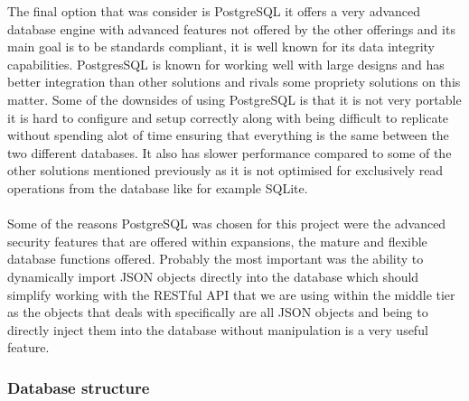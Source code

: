 The final option that was consider is PostgreSQL it offers a very advanced database engine with advanced features not offered by the other offerings and its main goal is to be standards compliant, it is well known for its data integrity capabilities. PostgresSQL is known for working well with large designs and has better integration than other solutions and rivals some propriety solutions on this matter. Some of the downsides of using PostgreSQL is that it is not very portable it is hard to configure and setup correctly along with being difficult to replicate without spending alot of time ensuring that everything is the same between the two different databases. It also has slower performance compared to some of the other solutions mentioned previously as it is not optimised for exclusively read operations from the database like for example SQLite.\\
\\
Some of the reasons PostgreSQL was chosen for this project were the advanced security features that are offered within expansions, the mature and flexible database functions offered. Probably the most important was the ability to dynamically import JSON objects directly into the database which should simplify working with the RESTful API that we are using within the middle tier as the objects that deals with specifically are all JSON objects and being to directly inject them into the database without manipulation is a very useful feature. 

\subsubsection*{Database structure}

